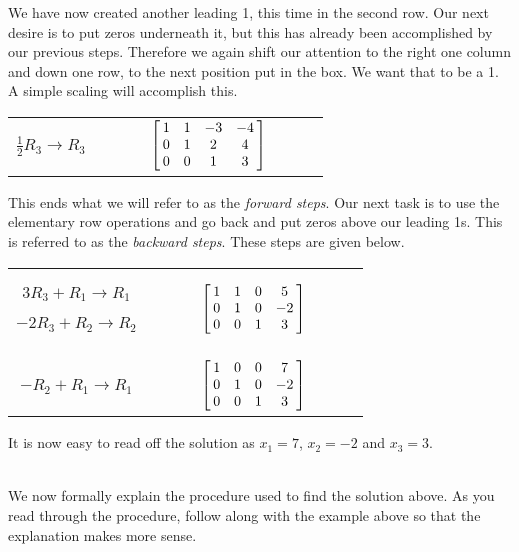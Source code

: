 {We have now created another leading 1, this time in the second row. Our next desire is to put zeros  underneath it, but this has already been accomplished by our previous steps. Therefore we again shift our attention to the right one column and down one row, to the next position put in the box. We want that to be a 1. A simple scaling will accomplish this.

\begin{center}\begin{tabular}{ccl}
\parbox{70pt}{\centering\small $\frac12R_3\rightarrow R_3$}
&$\quad \quad$&
$\bmx{cccc}1&1&-3&-4\\0&1&2&4 \\0&0&1&3\emx$
\end{tabular}\end{center}


This ends what we will refer to as the \textit{forward steps}. Our next task is to use the elementary row operations and go back and put zeros above our leading 1s. This is referred to as the \textit{backward steps}. These steps are given below.

\begin{center}\begin{tabular}{ccl}
\parbox{70pt}{\centering\small $3R_3+R_1\rightarrow R_1$\\

$-2R_3+R_2\rightarrow R_2$}
&$\quad \quad$&
$\bmx{cccc}1&1&0&5\\0&1&0&-2 \\0&0&1&3\emx$\\
\\
\parbox{70pt}{\centering\small$-R_2+R_1\rightarrow R_1$}
&$\quad \quad$&
$\bmx{cccc}1&0&0&7\\0&1&0&-2 \\0&0&1&3\emx$
\end{tabular}\end{center}

It is now easy to read off the solution as $x_1 = 7$, $x_2 = -2$ and $x_3 = 3$.}\\ %

We now formally explain the procedure used to find the solution above. As you read through the procedure, follow along with the example above so that the explanation makes more sense.\\

